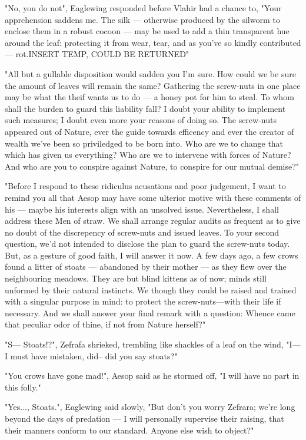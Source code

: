 "No, you do not", Eaglewing responded before Vlahir had a chance to, "Your apprehension saddens me. The silk — otherwise produced by the silworm to enclose them in a robust cocoon — may be used to add a thin transparent hue around the leaf: protecting it from wear, tear, and as you've so kindly contributed — rot.INSERT TEMP, COULD BE RETURNED"

"All but a gullable disposition would sadden you I'm sure. How could we be sure the amount of leaves will remain the same? Gathering the screw-nuts in one place may be what the theif wants us to do — a honey pot for him to steal. To whom shall the burden to guard this liability fall? I doubt your ability to implement such measures; I doubt even more your reasons of doing so. The screw-nuts appeared out of Nature, ever the guide towards efficency and ever the creator of wealth we've been so priviledged to be born into. Who are we to change that which has given us everything? Who are we to intervene with forces of Nature? And who are you to conspire against Nature, to conspire for our mutual demise?"

"Before I respond to these ridiculus acusations and poor judgement, I want to remind you all that Aesop may have some ulterior motive with these comments of his — maybe his interests align with an unsolved issue.
Nevertheless, I shall address these Men of straw.
We shall arrange regular audits as frequent as to give no doubt of the discrepency of screw-nuts and issued leaves.
To your second question, we'd not intended to disclose the plan to guard the screw-nuts today. But, as a gesture of good faith, I will answer it now. A few days ago, a few crows found a litter of stoats — abandoned by their mother — as they flew over the neighbouring meadows. They are but blind kittens as of now; minds still unformed by their natural instincts. We though they could be raised and trained with a singular purpose in mind: to protect the screw-nuts—with their life if necessary.
And we shall answer your final remark with a question: Whence came that peculiar odor of thine, if not from Nature herself?"

"S— Stoats!?", Zefrafa shrieked, trembling like shackles of a leaf on the wind, "I— I must have mistaken, did– did you say stoats?"

"You crows have gone mad!", Aesop said as he stormed off, "I will have no part in this folly."

"Yes..., Stoats.", Eaglewing said slowly, "But don't you worry Zefrara; we're long beyond the days of predation — I will personally supervise their raising, that their manners conform to our standard. Anyone else wish to object?"



